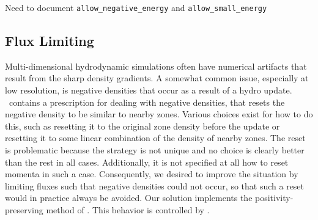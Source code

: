 Need to document {\tt allow\_negative\_energy} and {\tt allow\_small\_energy}



\subsection{Flux Limiting}
\label{app:hydro:flux_limiting}

Multi-dimensional hydrodynamic simulations often have numerical
artifacts that result from the sharp density gradients.  A somewhat
common issue, especially at low resolution, is negative densities that
occur as a result of a hydro update.  \castro\ contains a prescription
for dealing with negative densities, that resets the negative density
to be similar to nearby zones. Various choices exist for how to do
this, such as resetting it to the original zone density before the
update or resetting it to some linear combination of the density of
nearby zones.  The reset is problematic because the strategy is not
unique and no choice is clearly better than the rest in all
cases. Additionally, it is not specified at all how to reset momenta
in such a case. Consequently, we desired to improve the situation by
limiting fluxes such that negative densities could not occur, so that
such a reset would in practice always be avoided. Our solution
implements the positivity-preserving method of \cite{hu:2013}.  This
behavior is controlled by
.


